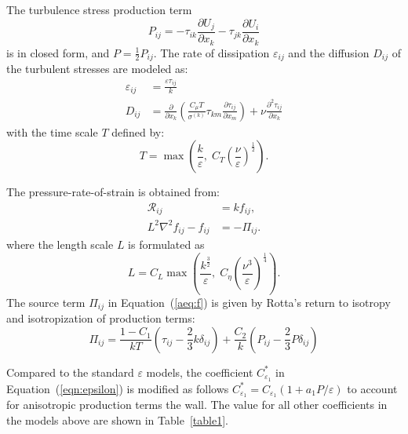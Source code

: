 \documentclass[11pt]{article}
\begin{document}
The turbulence stress production term
\begin{equation}
  \label{eq:Pij}
 P_{ij} = -\tau_{ik} \frac{\partial U_{j}}{\partial x_{k}} -  
 \tau_{jk} \frac{\partial U_{i}}{\partial x_{k}}
\end{equation}
is in closed form, and $P = \frac{1}{2}P_{ij}$.  The rate of dissipation
$\varepsilon_{ij}$ and the diffusion $D_{ij}$ of the turbulent
stresses are modeled as:
\begin{align}
\varepsilon_{ij} & = \frac{\varepsilon \tau_{ij}}{k} \\
D_{ij} &  =  \frac{\partial} {\partial x_{k}}
\left( \frac{C_{\mu}T}{\sigma^{(k)}} \tau_{km}
  \frac{\partial \tau_{ij}}{\partial x_{m}} 
\right)
  +  \nu \frac{\partial^2 \tau_{ij}}{ \partial x_k}
\label{eqn:Dij}
\end{align}
with the time scale $T$ defined by:
\begin{equation}
T=\max\left(\frac{k}{\varepsilon}, \;
  C_T\left(\frac{\nu}{\varepsilon}\right)^{\frac{1}{2}}\right).   
\end{equation}

The pressure-rate-of-strain is obtained from:
\begin{subequations}
\begin{align}
\mathcal{R}_{ij}&=k f_{ij},  \\
 L^2\nabla^2f_{ij}-f_{ij}&=-\Pi_{ij}. \label{aeq:f}
\end{align}
\end{subequations}
where the length scale $L$ is formulated as
\begin{equation}
L=C_L \max\left(\frac{k^\frac{3}{2}}{\varepsilon}, \;
  C_{\eta}\left(\frac{\nu^3}{\varepsilon}\right)^{\frac{1}{4}}\right). 
\end{equation}
The source term $\Pi_{ij}$ in Equation~(\ref{aeq:f}) is given by
Rotta's return to isotropy and isotropization of production terms:
\begin{equation}
 \Pi_{ij} =  \frac{1- C_1}{kT} \left( \tau_{ij} -\frac{2}{3}k
 \delta_{ij}  \right) + \frac{C_2}{k} \left( P_{ij} - \frac{2}{3}P \delta_{ij} \right)
\end{equation}

Compared to the standard $\varepsilon$ models, the coefficient
$C_{\varepsilon_1}^*$ in Equation~(\ref{eqn:epsilon}) is modified as
follows $C_{\varepsilon_1}^* = C_{\varepsilon_1} (1 + a_1
P/\varepsilon)$ to account for anisotropic production terms the wall.
The value for all other coefficients in the models above are shown
in Table~\ref{table1}.
\end{document}
